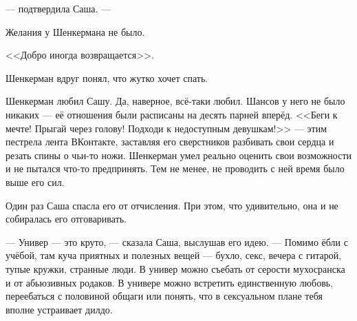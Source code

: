 \hspace{0.2em}


--- подтвердила Саша. ---

\hspace{0.2em}





Желания у Шенкермана не было.

\hspace{0.2em}






<<Добро иногда возвращается>>.

Шенкерман вдруг понял, что жутко хочет спать.

\asterism

Шенкерман любил Сашу.
Да, наверное, всё-таки любил.
Шансов у него не было никаких --- её отношения были расписаны на десять парней вперёд.
<<Беги к мечте!
Прыгай через голову!
Подходи к недоступным девушкам!>> --- этим пестрела лента ВКонтакте, заставляя его сверстников разбивать свои сердца и резать спины о чьи-то ножи.
Шенкерман умел реально оценить свои возможности и не пытался что-то предпринять.
Тем не менее, не проводить с ней время было выше его сил.

Один раз Саша спасла его от отчисления.
При этом, что удивительно, она и не собиралась его отговаривать.

--- Универ --- это круто, --- сказала Саша, выслушав его идею.
--- Помимо ёбли с учёбой, там куча приятных и полезных вещей --- бухло, секс, вечера с гитарой, тупые кружки, странные люди.
В универ можно съебать от серости мухосранска и от абьюзивных родаков.
В универе можно встретить единственную любовь, переебаться с половиной общаги или понять, что в сексуальном плане тебя вполне устраивает дилдо.

